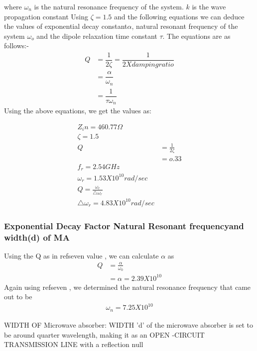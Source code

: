 \documentclass[journal]{IEEEtran}
\begin{document}
where $\omega_n $ is the natural resonance frequency of the system. $k$ is the wave propagation constant
Using $\zeta=1.5 $ and the following equations we can deduce the values of exponential decay constant$\alpha$, natural resonant frequency of the system $\omega_o$ and the dipole relaxation time constant $\tau$. The equations are as follows:-
\begin{align}
 Q &= \dfrac{1}{2 \zeta} = \dfrac{1}{2 X damping ratio} \label{five}\\
   &= \dfrac{\alpha}{\omega_n} \label{six}\\
   &= \dfrac{1}{\tau \omega_n}
\end{align}
 Using the above equations, we get the values as:
 
\begin{align} 
 Z_in = 460.77 \Omega \\
\zeta = 1.5  \\
Q &= \frac{1}{2 \zeta}  \\
 &=  o.33 \label{seven} \\ 
f_r = 2.54 GHz   \\
\omega_r = 1.53 X 10^{10} rad/sec \\
Q = \frac{\omega_r}{\triangle  \omega_r} \\
\triangle \omega_r = 4.83 X 10^{10} rad/sec
\end{align}

\subsubsection{Exponential Decay Factor Natural Resonant frequencyand width(d) of MA}
Using the Q as in ref{seven} value , we can calculate $ \alpha$ as 
\begin{align} 
Q &= \frac{\alpha}{\omega_0}\\
 &= \alpha = 2.39 X 10^{10} \label{polar}
\end{align}
Again using ref{seven} , we determined the natural resonance frequency that came out to be 
\begin{align*}
\omega_n = 7.25 X 10^{10}
\end{align*}
\hfill


WIDTH OF Microwave absorber: WIDTH 'd' of the
 microwave absorber is set to be around quarter wavelength, 
 making it as an OPEN -CIRCUIT TRANSMISSION LINE with a reflection null \cite{Tooley}
\end{document}
